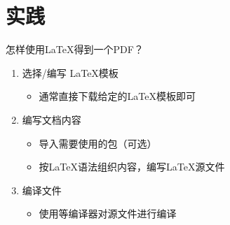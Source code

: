 
\section{实践}

\begin{frame}[fragile]{怎样使用\LaTeX{}得到一个PDF？}
	\begin{enumerate}
		\item 选择/编写 \LaTeX{}模板
		      \begin{itemize}
			      \item 通常直接下载给定的\LaTeX{}模板即可
		      \end{itemize}
		\item 编写文档内容
		      \begin{itemize}
			      \item 导入需要使用的包（可选）
			      \item 按\LaTeX{}语法组织内容，编写\LaTeX{}源文件
		      \end{itemize}
		\item 编译文件
		      \begin{itemize}
			      \item 使用\XeLaTeX{}等编译器对源文件进行编译
		      \end{itemize}
	\end{enumerate}
\end{frame}




